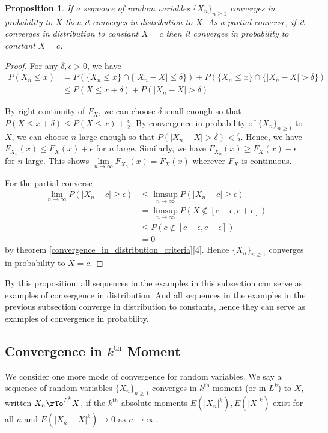 \documentclass[12pt]{amsart}
\newtheorem{proposition}[theorem]{Proposition}
\theoremstyle{definition}
\begin{document}
\begin{proposition} \label{convergence_in_probability_convergence_in_distribution} If a sequence of random variables $\{X_n\}_{n \geq 1}$ converges in probability to $X$ then it converges in distribution to $X$. As a partial converse, if it converges in distribution to constant $X = c$ then it converges in probability to constant $X = c$.
\end{proposition}
\begin{proof} For any $\delta, \epsilon > 0$, we have
\begin{align*}
P(X_n \leq x) & = P(\{X_n \leq x\} \cap \{|X_n - X| \leq \delta\}) + P(\{X_n \leq x\} \cap \{|X_n - X| > \delta\}) \\
 & \leq P(X \leq x + \delta) + P(|X_n - X| > \delta)
\end{align*}

By right continuity of $F_X$, we can choose $\delta$ small enough so that $P(X \leq x + \delta) \leq P(X \leq x) + \frac{\epsilon}{2}$. By convergence in probability of $\{X_n\}_{n \geq 1}$ to $X$, we can choose $n$ large enough so that $P(|X_n - X| > \delta) < \frac{\epsilon}{2}$. Hence, we have $F_{X_n}(x) \leq F_X(x) + \epsilon$ for $n$ large. Similarly, we have $F_{X_n}(x) \geq F_X(x) - \epsilon$ for $n$ large. This shows $\lim\limits_{n \to \infty} F_{X_n}(x) = F_X(x)$ wherever $F_X$ is continuous.

For the partial converse
\begin{align*}
\lim\limits_{n \to \infty} P(|X_n - c| \geq \epsilon) & \leq \limsup\limits_{n \to \infty} P(|X_n - c| \geq \epsilon) \\
 & = \limsup\limits_{n \to \infty} P(X \nin [c - \epsilon, c + \epsilon]) \\
 & \leq P(c \nin [c - \epsilon, c + \epsilon]) \\
 & = 0
\end{align*}
by theorem \ref{convergence_in_distribution_criteria}[4]. Hence $\{X_n\}_{n \geq 1}$ converges in probability to $X = c$.
\end{proof}

By this proposition, all sequences in the examples in this subsection can serve as examples of convergence in distribution. And all sequences in the examples in the previous subsection converge in distribution to constants, hence they can serve as examples of convergence in probability.

\subsection{Convergence in $k^{\text{th}}$ Moment} We consider one more mode of convergence for random variables.
\dfn We say a sequence of random variables $\{X_n\}_{n \geq 1}$ converges in $k^{\text{th}}$ moment (or in $L^{k}$) to $X$, written $X_n \rTo^{L^k} X$, if the $k^{\text{th}}$ absolute moments $E(|X_n|^k), E(|X|^k)$ exist for all $n$ and $E(|X_n - X|^k) \rightarrow 0 \text{ as } n \rightarrow \infty$.
\end{document}
